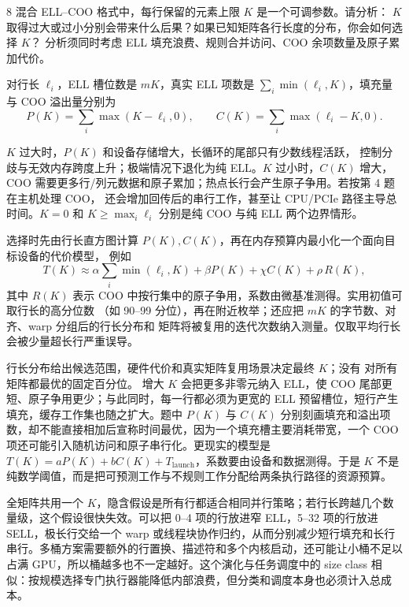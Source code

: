 \begin{solutionexercise}{8}
\problemheading 混合 ELL--COO 格式中，每行保留的元素上限 $K$ 是一个可调参数。请分析：
$K$ 取得过大或过小分别会带来什么后果？如果已知矩阵各行长度的分布，你会如何选择 $K$？
分析须同时考虑 ELL 填充浪费、规则合并访问、COO 余项数量及原子累加代价。

\approachheading 对行长 $\ell_i$，ELL 槽位数是 $mK$，真实 ELL 项数是
$\sum_i\min(\ell_i,K)$，填充量与 COO 溢出量分别为
\[
P(K)=\sum_i\max(K-\ell_i,0),\qquad
C(K)=\sum_i\max(\ell_i-K,0).
\]

\answerheading $K$ 过大时，$P(K)$ 和设备存储增大，长循环的尾部只有少数线程活跃，
控制分歧与无效内存跨度上升；极端情况下退化为纯 ELL。$K$ 过小时，$C(K)$ 增大，COO
需要更多行/列元数据和原子累加；热点长行会产生原子争用。若按第 4 题在主机处理 COO，
还会增加回传后的串行工作，甚至让 CPU/PCIe 路径主导总时间。$K=0$ 和
$K\ge\max_i\ell_i$ 分别是纯 COO 与纯 ELL 两个边界情形。

选择时先由行长直方图计算 $P(K),C(K)$，再在内存预算内最小化一个面向目标设备的代价模型，
例如
\[
 T(K)\approx \alpha\sum_i\min(\ell_i,K)
       +\beta P(K)+\chi C(K)+\rho\,R(K),
\]
其中 $R(K)$ 表示 COO 中按行集中的原子争用，系数由微基准测得。实用初值可取行长的高分位数
（如 90--99 分位），再在附近枚举；还应把 $mK$ 的字节数、对齐、warp 分组后的行长分布和
矩阵将被复用的迭代次数纳入测量。仅取平均行长会被少量超长行严重误导。

\conclusionheading 行长分布给出候选范围，硬件代价和真实矩阵复用场景决定最终 $K$；没有
对所有矩阵都最优的固定百分位。
\discussionheading
{}
增大 $K$ 会把更多非零元纳入 ELL，使 COO 尾部更短、原子争用更少；与此同时，每一行都必须为更宽的 ELL 预留槽位，短行产生填充，缓存工作集也随之扩大。题中 $P(K)$ 与 $C(K)$ 分别刻画填充和溢出项数，却不能直接相加后宣称时间最优，因为一个填充槽主要消耗带宽，一个 COO 项还可能引入随机访问和原子串行化。更现实的模型是 $T(K)=aP(K)+bC(K)+T_{\mathrm{launch}}$，系数要由设备和数据测得。于是 $K$ 不是纯数学阈值，而是把可预测工作与不规则工作分配给两条执行路径的资源预算。

全矩阵共用一个 $K$，隐含假设是所有行都适合相同并行策略；若行长跨越几个数量级，这个假设很快失效。可以把 0--4 项的行放进窄 ELL，5--32 项的行放进 SELL，极长行交给一个 warp 或线程块协作归约，从而分别减少短行填充和长行串行。多桶方案需要额外的行置换、描述符和多个内核启动，还可能让小桶不足以占满 GPU，所以桶越多也不一定越好。这个演化与任务调度中的 size class 相似：按规模选择专门执行器能降低内部浪费，但分类和调度本身也必须计入总成本。


\end{solutionexercise}
